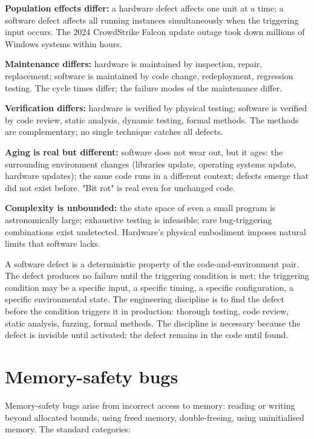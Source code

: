 \textbf{Population effects differ:} a hardware defect affects one unit at a time; a software defect affects all running instances simultaneously when the triggering input occurs. The 2024 CrowdStrike Falcon update outage took down millions of Windows systems within hours.

\textbf{Maintenance differs:} hardware is maintained by inspection, repair, replacement; software is maintained by code change, redeployment, regression testing. The cycle times differ; the failure modes of the maintenance differ.

\textbf{Verification differs:} hardware is verified by physical testing; software is verified by code review, static analysis, dynamic testing, formal methods. The methods are complementary; no single technique catches all defects.

\textbf{Aging is real but different:} software does not wear out, but it ages: the surrounding environment changes (libraries update, operating systems update, hardware updates); the same code runs in a different context; defects emerge that did not exist before. "Bit rot" is real even for unchanged code.

\textbf{Complexity is unbounded:} the state space of even a small program is astronomically large; exhaustive testing is infeasible; rare bug-triggering combinations exist undetected. Hardware's physical embodiment imposes natural limits that software lacks.

\begin{archetype}
A software defect is a deterministic property of the code-and-environment pair. The defect produces no failure until the triggering condition is met; the triggering condition may be a specific input, a specific timing, a specific configuration, a specific environmental state. The engineering discipline is to find the defect before the condition triggers it in production: thorough testing, code review, static analysis, fuzzing, formal methods. The discipline is necessary because the defect is invisible until activated; the defect remains in the code until found.
\end{archetype}

\section{Memory-safety bugs}

Memory-safety bugs arise from incorrect access to memory: reading or writing beyond allocated bounds, using freed memory, double-freeing, using uninitialised memory. The standard categories:

